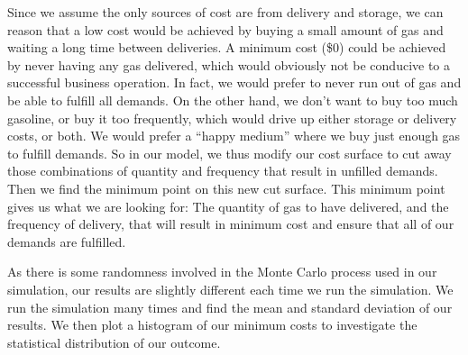 \documentclass{article}
\begin{document}
    Since we assume the only sources of cost are from delivery and storage, we can reason that a low cost would be achieved by buying a small amount of gas and waiting a long time between deliveries. A minimum cost (\$0) could be achieved by never having any gas delivered, which would obviously not be conducive to a successful business operation. In fact, we would prefer to never run out of gas and be able to fulfill all demands. On the other hand, we don’t want to buy too much gasoline, or buy it too frequently, which would drive up either storage or delivery costs, or both. We would prefer a “happy medium” where we buy just enough gas to fulfill demands. So in our model, we thus modify our cost surface to cut away those combinations of quantity and frequency that result in unfilled demands. Then we find the minimum point on this new cut surface. This minimum point gives us what we are looking for: The quantity of gas to have delivered, and the frequency of delivery, that will result in minimum cost and ensure that all of our demands are fulfilled.

    As there is some randomness involved in the Monte Carlo process used in our simulation, our results are slightly different each time we run the simulation. We run the simulation many times and find the mean and standard deviation of our results. We then plot a histogram of our minimum costs to investigate the statistical distribution of our outcome.
    \pagebreak
\end{document}
